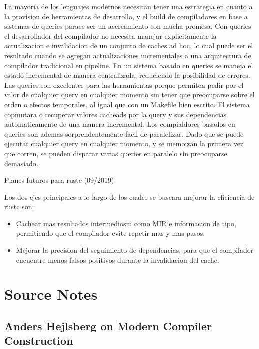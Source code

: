 \documentclass[12pt, a4paper]{report}
\begin{document}
  La mayoria de los lenguajes modernos necesitan tener una estrategia en cuanto a la provision de herramientas de desarrollo, y el build de compiladores en base a sistemas de queries parace ser un acercamiento con mucha promesa.
  Con queries el desarrollador del compilador no necesita manejar explicitamente la actualizacion e invalidacion de un conjunto de caches ad hoc, lo cual puede ser el resultado cuando se agregan actualizaciones incrementales a una arquitectura de compilador tradicional en pipeline.
  En un sistema basado en queries se maneja el estado incremental de manera centralizada, reduciendo la posibilidad de errores.
  Las queries son excelentes para las herramientas porque permiten pedir por el valor de cualquier query en cualquier momento sin tener que preocuparse sobre el orden o efectos temporales, al igual que con un Makefile bien escrito.
  El sistema copmutara o recuperar valores cacheads por la query y sus dependencias automaticamente de una manera incremental.
  Los compialdores basados en queries son ademas sorprendentemente facil de paralelizar.
  Dado que se puede ejecutar cualquier query en cualquier momento, y se memoizan la primera vez que corren, se pueden disparar varias queries en paralelo sin preocuparse demasiado.
  \cite{olle_query_based}

  Planes futuros para rustc (09/2019)

  Los dos ejes principales a lo largo de los cuales se buscara mejorar la eficiencia de rustc son:
  \begin{itemize}[noitemsep]
  \item Cachear mas resultados intermediosm como MIR e informacion de tipo, permitiendo que el compilador evite repetir mas y mas pasos.
  \item Mejorar la precision del seguimiento de dependencias, para que el compilador encuentre menos falsos positivos durante la invalidacion del cache.
  \end{itemize}
  \cite{rust_blog_incremental_compilation}

\chapter*{Source Notes}

  \section*{Anders Hejlsberg on Modern Compiler Construction}
  \cite{hejlsberg_modern_compiler_construction}
\end{document}
